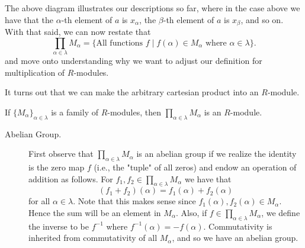 \begin{definition}
\begin{center}
    \end{center}
    \textcolor{NavyBlue}{
    The above diagram illustrates our descriptions so far, where
    in the case above we have that the $\alpha$-th element of $a$
    is $x_\alpha$, the $\beta$-th element of $a$ is $x_\beta$, and
    so on. With
    that said, we can now restate that 
    \[
        \prod_{\alpha \in \lambda} M_\alpha = \{\text{All functions } f \mid  f(\alpha) \in M_\alpha \text{ where } \alpha \in \lambda \}.
    \]
    and move onto understanding why we want to
    adjust our definition for multiplication of $R$-modules. 
    }

    It turns out that we can make the arbitrary cartesian product
    into an $R$-module. 

    \begin{proposition}
        If $\{M_\alpha\}_{\alpha \in \lambda}$ is a family of
        $R$-modules, then $\displaystyle \prod_{\alpha \in 
        \lambda}M_{\alpha}$ is an $R$-module.
    \end{proposition}

    \begin{prf}
        \begin{description}
            \item[Abelian Group.] First observe that $\displaystyle
            \prod_{\alpha \in \lambda} M_\alpha$ is an abelian group
            if we realize the identity is the zero map $f$ (i.e., the
            "tuple" of all zeros) and endow an operation of addition as follows. For
            $f_1,
            f_2 \in \displaystyle \prod_{\alpha \in \lambda} M_\alpha$
            we have that 
            \[
                (f_1 + f_2)(\alpha) = f_1(\alpha) + f_2(\alpha)
            \]
            for all $\alpha \in \lambda$. Note that this makes sense
            since $f_1(\alpha), f_2(\alpha) \in M_\alpha$. Hence the
            sum will be an element in $M_\alpha$. Also, if $f \in
            \displaystyle \prod_{\alpha \in \lambda} M_\alpha$, we
            define the inverse to be $f^{-1}$ where $f^{-1}(\alpha) =
            -f(\alpha)$. Commutativity is inherited from commutativity
            of all $M_\alpha$, and so we have an abelian group.


\end{description}
\end{prf}
\end{definition}

